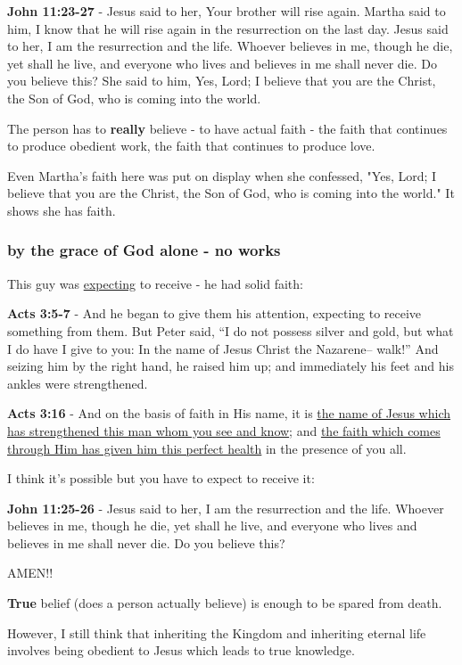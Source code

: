 \documentclass[11pt]{article}
\begin{document}
\textbf{John 11:23-27} - Jesus said to her, Your brother will rise again.  Martha said to him, I know that he will rise again in the resurrection on the last day.  Jesus said to her, I am the resurrection and the life. Whoever believes in me, though he die, yet shall he live, and everyone who lives and believes in me shall never die. Do you believe this?  She said to him, Yes, Lord; I believe that you are the Christ, the Son of God, who is coming into the world.

The person has to \textbf{really} believe - to have actual faith - the faith that continues to produce obedient work, the faith that continues to produce love.

Even Martha's faith here was put on display when she confessed,
"Yes, Lord; I believe that you are the Christ, the Son of God, who is coming into the world."
It shows she has faith.

\subsubsection{by the grace of God alone - no works}
\label{sec:orgd4cad76}
This guy was \uline{expecting} to receive - he had solid faith:

\textbf{Acts 3:5-7} - And he began to give them his attention, expecting to receive something from them. But Peter said, “I do not possess silver and gold, but what I do have I give to you: In the name of Jesus Christ the Nazarene-- walk!” And seizing him by the right hand, he raised him up; and immediately his feet and his ankles were strengthened.

\textbf{Acts 3:16} - And on the basis of faith in His name, it is \uline{the name of Jesus which has strengthened this man whom you see and know}; and \uline{the faith which comes through Him has given him this perfect health} in the presence of you all.

I think it's possible but you have to expect to receive it:

\textbf{John 11:25-26} - Jesus said to her, I am the resurrection and the life. Whoever believes in me, though he die, yet shall he live, and everyone who lives and believes in me shall never die. Do you believe this?

AMEN!!

\textbf{True} belief (does a person actually believe) is enough to be spared from death.

However, I still think that inheriting the Kingdom and inheriting eternal life involves being obedient to Jesus which leads to true knowledge.
\end{document}
